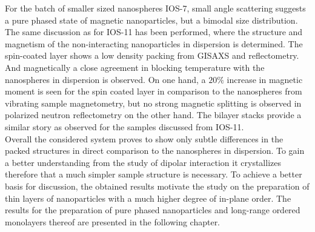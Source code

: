 \documentclass[\main/dresen_thesis.tex]{subfiles}
\begin{document}
  For the batch of smaller sized nanospheres IOS-7, small angle scattering suggests a pure phased state of magnetic nanoparticles, but a bimodal size distribution.
  The same discussion as for IOS-11 has been performed, where the structure and magnetism of the non-interacting nanoparticles in dispersion is determined.
  The spin-coated layer shows a low density packing from GISAXS and reflectometry. And magnetically a close agreement in blocking temperature with the nanospheres in dispersion is observed.
  On one hand, a $20 \%$ increase in magnetic moment is seen for the spin coated layer in comparison to the nanospheres from vibrating sample magnetometry, but no strong magnetic splitting is observed in polarized neutron reflectometry on the other hand.
  The bilayer stacks provide a similar story as observed for the samples discussed from IOS-11.
  \\

  Overall the considered system proves to show only subtle differences in the packed structures in direct comparison to the nanospheres in dispersion.
  To gain a better understanding from the study of dipolar interaction it crystallizes therefore that a much simpler sample structure is necessary.
  To achieve a better basis for discussion, the obtained results motivate the study on the preparation of thin layers of nanoparticles with a much higher degree of in-plane order.
  The results for the preparation of pure phased nanoparticles and long-range ordered monolayers thereof are presented in the following chapter.
\end{document}
